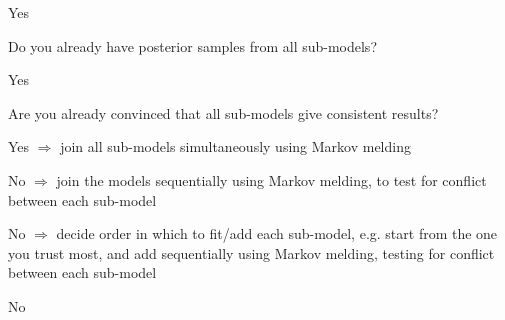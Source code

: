 \documentclass{article}
\begin{document}
\begin{tree}
\begin{tree}
\begin{tree}
        \begin{tree}
            \item Yes
            \begin{tree}
                \item Do you already have posterior samples from all sub-models?
                \begin{tree}
                    \item Yes
                    \begin{tree}
                        \item Are you already convinced that all sub-models give consistent results?
                        \begin{tree}
                            \item Yes $\Rightarrow$ join all sub-models simultaneously using Markov melding
                            \item No $\Rightarrow$ join the models sequentially using Markov melding, to test for conflict between each sub-model
                        \end{tree}
                    \end{tree}
                    \item No $\Rightarrow$ decide order in which to fit/add each sub-model, e.g. start from the one you trust most, and add sequentially using Markov melding, testing for conflict between each sub-model
                \end{tree}
            \end{tree}
            \item No
        \end{tree}
        \end{tree}
    \end{tree}
\end{tree}
\end{document}
